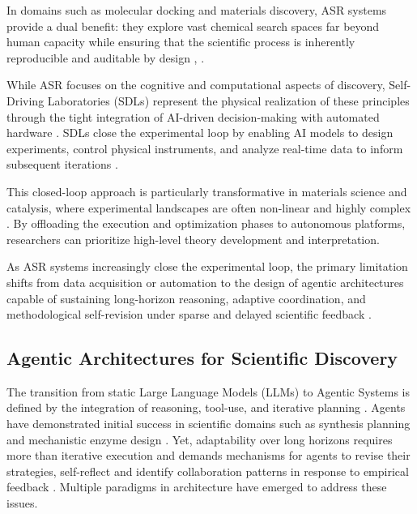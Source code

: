 \documentclass{article}
\begin{document}
In domains such as molecular docking and materials discovery, ASR systems provide a dual benefit: they explore vast chemical search spaces far beyond human capacity while ensuring that the scientific process is inherently reproducible and auditable by design \cite{1_tang_ai-researcher_2025}, \cite{2_wei_ai_2025}.

While ASR focuses on the cognitive and computational aspects of discovery, Self-Driving Laboratories (SDLs) represent the physical realization of these principles through the tight integration of AI-driven decision-making with automated hardware \cite{6_tom_self-driving_2024}. SDLs close the experimental loop by enabling AI models to design experiments, control physical instruments, and analyze real-time data to inform subsequent iterations \cite{5_tobias_autonomous_2025}.

This closed-loop approach is particularly transformative in materials science and catalysis, where experimental landscapes are often non-linear and highly complex \cite{6_tom_self-driving_2024}. By offloading the execution and optimization phases to autonomous platforms, researchers can prioritize high-level theory development and interpretation.

As ASR systems increasingly close the experimental loop, the primary limitation shifts from data acquisition or automation to the design of agentic architectures capable of sustaining long-horizon reasoning, adaptive coordination, and methodological self-revision under sparse and delayed scientific feedback \cite{zhou2025autonomousagentsscientificdiscovery}.

\subsection{Agentic Architectures for Scientific Discovery}


The transition from static Large Language Models (LLMs) to Agentic Systems is defined by the integration of reasoning, tool-use, and iterative planning \cite{8_huang_towards_2023}. Agents have demonstrated initial success in scientific domains such as synthesis planning \cite{12_xuan-vu_synthelite_2025} and mechanistic enzyme design \cite{16_jacob_beyond_2025}. Yet, adaptability over long horizons requires more than iterative execution and demands mechanisms for agents to revise their strategies, self-reflect and identify collaboration patterns in response to empirical feedback \cite{zhou2025autonomousagentsscientificdiscovery}. Multiple paradigms in architecture have emerged to address these issues.
\end{document}
